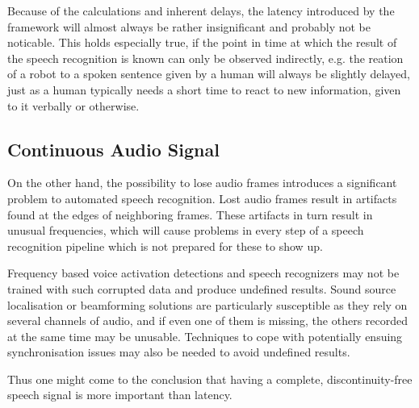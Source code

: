 Because of the calculations and inherent delays, the latency introduced by the framework will almost always be rather insignificant and probably not be noticable. 
This holds especially true, if the point in time at which the result of the speech recognition is known can only be observed indirectly, e.g. the reation of a robot to a spoken sentence given by a human will always be slightly delayed, just as a human typically needs a short time to react to new information, given to it verbally or otherwise.

\subsection{Continuous Audio Signal}
On the other hand, the possibility to lose audio frames introduces a significant problem to automated speech recognition.
Lost audio frames result in artifacts found at the edges of neighboring frames. 
These artifacts in turn result in unusual frequencies, which will cause problems in every step of a speech recognition pipeline which is not prepared for these to show up. 

Frequency based voice activation detections and speech recognizers may not be trained with such corrupted data and produce undefined results.
Sound source localisation or beamforming solutions are particularly susceptible as they rely on several channels of audio, and if even one of them is missing, the others recorded at the same time may be unusable.
Techniques to cope with potentially ensuing synchronisation issues may also be needed to avoid undefined results.
	
Thus one might come to the conclusion that having a complete, discontinuity-free speech signal is more important than latency. 
